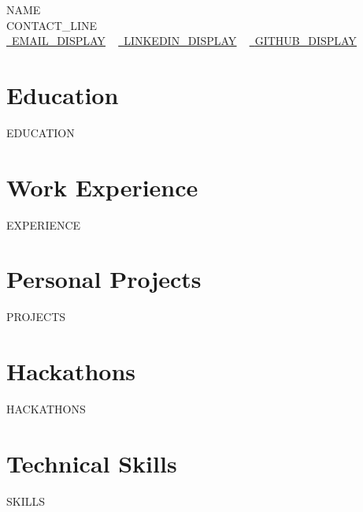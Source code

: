 \documentclass[letterpaper,11pt]{article}
\newcommand{\resumeSubHeadingListStart}{\begin{itemize}[leftmargin=0.0in, label={}]}
\newcommand{\resumeSubHeadingListEnd}{\end{itemize}}
\begin{document}
    \begin{center}
        {\Huge\scshape {{NAME}}}
        \\ {{CONTACT_LINE}}\\
        \small
        \href{mailto:{{EMAIL_URL}}}{\raisebox{-0.2\height}\faEnvelope\  \underline{{{EMAIL_DISPLAY}}}} ~
        \href{{{LINKEDIN_URL}}}{\raisebox{-0.2\height}\faLinkedin\ \underline{{{LINKEDIN_DISPLAY}}}}  ~
        \href{{{GITHUB_URL}}}{\raisebox{-0.2\height}\faGithub\ \underline{{{GITHUB_DISPLAY}}}}
    \end{center}

\section{Education}
  \resumeSubHeadingListStart
{{EDUCATION}}
  \resumeSubHeadingListEnd

\section{Work Experience}
  \resumeSubHeadingListStart
{{EXPERIENCE}}
  \resumeSubHeadingListEnd

\section{Personal Projects}
\resumeSubHeadingListStart
{{PROJECTS}}
\resumeSubHeadingListEnd

\section{Hackathons}
\resumeSubHeadingListStart
{{HACKATHONS}}
\resumeSubHeadingListEnd

\section{Technical Skills}
\vspace{-2pt}
\begin{itemize}
[leftmargin=0.15in, label={}]\small{\item{
{{SKILLS}}
}}
\end{itemize}
\end{document}

